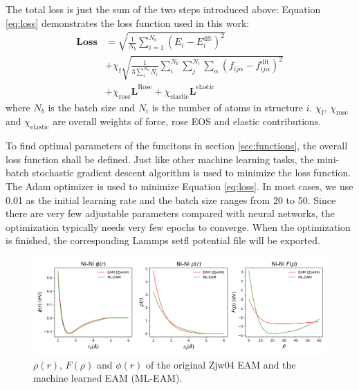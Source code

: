 \documentclass[final,3p,times]{elsarticle}
\begin{document}
The total loss is just the sum of the two steps introduced above:
Equation \ref{eq:loss} demonstrates the loss function used in 
this work:
\begin{align}
\label{eq:loss}
\mathbf{Loss} & = \sqrt{\frac{1}{N_{b}}\sum_{i=1}^{N_{b}}{\left(
    E_{i} - E_{i}^{\mathrm{dft}}
\right)^2}} \nonumber \\
& + \chi_{\mathrm{f}}\sqrt{
    \frac{1}{3\sum_{i}^{N_{b}}{N_i}}\sum_{i}^{N_b}{\sum_{j}^{N_i}{
        \sum_{\alpha}{
            \left(f_{ij\alpha} - f_{ij\alpha}^{\mathrm{dft}}\right)^2
        }
    }}
} \nonumber \\
& + \chi_{\mathrm{rose}}\mathbf{L}^{\mathrm{Rose}} 
+ \chi_{\mathrm{elastic}}\mathbf{L}^{\mathrm{elastic}}
\end{align} 
where $N_{b}$ is the batch size and $N_i$ is the number of atoms in structure 
$i$. $\chi_{\mathrm{f}}$, $\chi_{\mathrm{rose}}$ and $\chi_{\mathrm{elastic}}$ 
are overall weights of force, rose EOS and elastic contributions. 

To find optimal parameters of the funcitons in section \ref{sec:functions}, the 
overall loss function shall be defined. Just like other machine learning tasks, 
the mini-batch stochastic gradient descent algorithm is used to minimize the 
loss function. 
The Adam optimizer \cite{adam} is used to minimize Equation \ref{eq:loss}. 
In most cases, we use 0.01 as the initial learning rate and the batch size 
ranges from 20 to 50. Since there are very few adjustable parameters compared 
with neural networks, the optimization typically needs very few epochs to 
converge. When the optimization is finished, the corresponding Lammps setfl 
potential file will be exported.

% 
%
\begin{figure}
\centering
\includegraphics[scale=0.4]{Ni_eam.png}
\caption{\label{fig:Ni_eam} $\rho(r)$, $F(\rho)$ and $\phi(r)$ of the original 
Zjw04 EAM and the machine learned EAM (ML-EAM).}
\end{figure}
\end{document}

